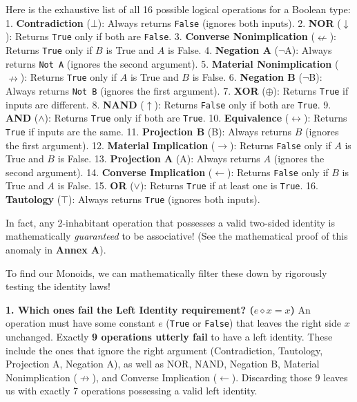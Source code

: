 \documentclass[
]{article}
\begin{document}
Here is the exhaustive list of all 16 possible logical operations for a
Boolean type: 1. \textbf{Contradiction} (\(\bot\)): Always returns
\texttt{False} (ignores both inputs). 2. \textbf{NOR} (\(\downarrow\)):
Returns \texttt{True} only if both are \texttt{False}. 3.
\textbf{Converse Nonimplication} (\(\nleftarrow\)): Returns
\texttt{True} only if \(B\) is True and \(A\) is False. 4.
\textbf{Negation A} (\(\neg\)A): Always returns \texttt{Not\ A} (ignores
the second argument). 5. \textbf{Material Nonimplication}
(\(\nrightarrow\)): Returns \texttt{True} only if \(A\) is True and
\(B\) is False. 6. \textbf{Negation B} (\(\neg\)B): Always returns
\texttt{Not\ B} (ignores the first argument). 7. \textbf{XOR}
(\(\oplus\)): Returns \texttt{True} if inputs are different. 8.
\textbf{NAND} (\(\uparrow\)): Returns \texttt{False} only if both are
\texttt{True}. 9. \textbf{AND} (\(\wedge\)): Returns \texttt{True} only
if both are \texttt{True}. 10. \textbf{Equivalence}
(\(\leftrightarrow\)): Returns \texttt{True} if inputs are the same. 11.
\textbf{Projection B} (B): Always returns \(B\) (ignores the first
argument). 12. \textbf{Material Implication} (\(\to\)): Returns
\texttt{False} only if \(A\) is True and \(B\) is False. 13.
\textbf{Projection A} (A): Always returns \(A\) (ignores the second
argument). 14. \textbf{Converse Implication} (\(\leftarrow\)): Returns
\texttt{False} only if \(B\) is True and \(A\) is False. 15. \textbf{OR}
(\(\vee\)): Returns \texttt{True} if at least one is \texttt{True}. 16.
\textbf{Tautology} (\(\top\)): Always returns \texttt{True} (ignores
both inputs).

In fact, any 2-inhabitant operation that possesses a valid two-sided
identity is mathematically \emph{guaranteed} to be associative! (See the
mathematical proof of this anomaly in \textbf{Annex A}).

To find our Monoids, we can mathematically filter these down by
rigorously testing the identity laws!

\textbf{1. Which ones fail the Left Identity requirement?
(\(e \diamond x = x\))} An operation must have some constant \(e\)
(\texttt{True} or \texttt{False}) that leaves the right side \(x\)
unchanged. Exactly \textbf{9 operations utterly fail} to have a left
identity. These include the ones that ignore the right argument
(Contradiction, Tautology, Projection A, Negation A), as well as NOR,
NAND, Negation B, Material Nonimplication (\(\nrightarrow\)), and
Converse Implication (\(\leftarrow\)). Discarding those 9 leaves us with
exactly 7 operations possessing a valid left identity.
\end{document}
